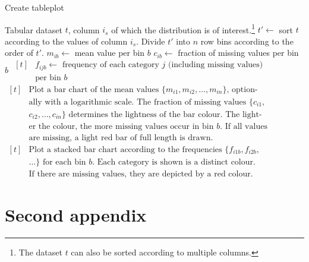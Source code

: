 \documentclass[11pt, fleqn, a4paper]{article}
\begin{document}
\begin{algorithm}[h]
\caption{Create tableplot}\label{alg}
\begin{minipage}{0.8\textwidth}
\begin{algorithmic}[1]
\Require Tabular dataset $t$, column $i_s$ of which the distribution is of interest.\footnote{The dataset $t$ can also be sorted according to multiple columns.}
\State $t'\leftarrow$ sort $t$ according to the values of column $i_s$.
\State Divide $t'$ into $n$ row bins according to the order of $t'$.
\State $m_{ib}\leftarrow$ mean value per bin $b$
\State $c_{ib}\leftarrow$ fraction of missing values per bin $b$
\EndIf
{}
\State $\begin{aligned}[t]
		&\mbox{$f_{ijb}\leftarrow$ frequency of each category $j$ (including missing values)}\\[-3pt]
		&\mbox{per bin $b$}
	\end{aligned}$
\EndIf
\EndFor
{}
\State $\begin{aligned}[t]
		&\mbox{Plot a bar chart of the mean values $\{m_{i1}, m_{i2},\ldots, m_{in}\}$, option-}\\[-3pt]
		&\mbox{ally with a logarithmic scale. The fraction of missing values $\{c_{i1},$}\\[-3pt]
		&\mbox{$c_{i2},\ldots, c_{in}\}$ determines the lightness of the bar colour. The light-}\\[-3pt]
		&\mbox{er the colour, the more missing values occur in bin $b$. If all values}\\[-3pt]
		&\mbox{are missing, a light red bar of full length is drawn.}
	\end{aligned}$
\EndIf
{}
\State $\begin{aligned}[t]
		&\mbox{Plot a stacked bar chart according to the frequencies $\{f_{i1b}, f_{i2b},$}\\[-3pt]
		&\mbox{$\ldots\}$ for each bin $b$. Each category is shown is a distinct colour.}\\[-3pt]
		&\mbox{If there are missing values, they are depicted by a red colour.}
	\end{aligned}$
\EndIf
\EndFor
\end{algorithmic}
\end{minipage}
\end{algorithm}

\section{Second appendix}
\end{document}

